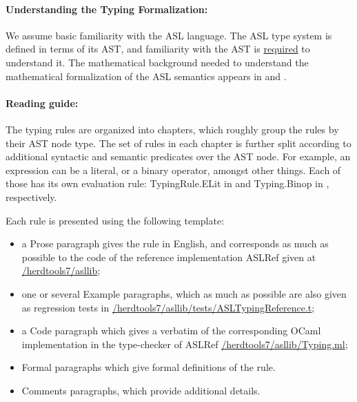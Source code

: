 \documentclass{book}
\begin{document}
\paragraph{Understanding the Typing Formalization:}
We assume basic familiarity with the ASL language.
The ASL type system is defined in terms of its AST,
and familiarity with the AST is \underline{required} to understand it.
The mathematical background needed to understand the mathematical formalization
of the ASL semantics appears in  and .

\paragraph{Reading guide:}
The typing rules are organized into chapters, which roughly group the rules by their AST node type.
The set of rules in each chapter is further split according to additional syntactic and semantic
predicates over the AST node.
For example, an expression can be a literal, or a binary operator, amongst other
things. Each of those has its own evaluation rule: TypingRule.ELit in
 and
Typing.Binop in , respectively.

Each rule is presented using the following template:
\begin{itemize}
\item a Prose paragraph gives the rule in English, and corresponds as much as possible to the code of the reference implementation ASLRef given at
\href{https://github.com/herd/herdtools7//tree/master/asllib}{/herdtools7/asllib};
\item one or several Example paragraphs, which as much as possible are also given as regression tests in
\href{https://github.com/herd/herdtools7//tree/master/asllib/tests/ASLTypingReference.t}{/herdtools7/asllib/tests/ASLTypingReference.t};
\ifcode
\item a Code paragraph which gives a verbatim of the corresponding OCaml implementation in the type-checker of ASLRef
\href{https://github.com/herd/herdtools7//tree/master/asllib/Typing.ml}{/herdtools7/asllib/Typing.ml};
\fi
\item Formal paragraphs which give formal definitions of the rule.
\item Comments paragraphs, which provide additional details. %
\end{itemize}
\end{document}
